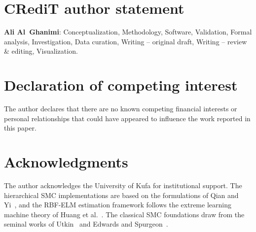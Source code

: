 \documentclass[preprint,12pt]{elsarticle}
\begin{document}
\section*{CRediT author statement}

\textbf{Ali Al~Ghanimi}: Conceptualization, Methodology, Software, Validation, Formal analysis, Investigation, Data curation, Writing -- original draft, Writing -- review \& editing, Visualization.


\section*{Declaration of competing interest}

The author declares that there are no known competing financial interests or personal relationships that could have appeared to influence the work reported in this paper.


\section*{Acknowledgments}

The author acknowledges the University of Kufa for institutional support. The hierarchical SMC implementations are based on the formulations of Qian and Yi~\cite{qian2015hierarchical}, and the RBF-ELM estimation framework follows the extreme learning machine theory of Huang et al.~\cite{huang2006extreme}. The classical SMC foundations draw from the seminal works of Utkin~\cite{utkin1977variable} and Edwards and Spurgeon~\cite{edwards1998sliding}.
\end{document}
